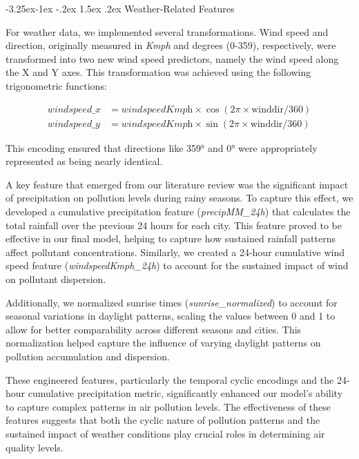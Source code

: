 \documentclass[twoside,11pt]{article}
\makeatletter
\renewcommand\subsubsection{\@startsection{subsubsection}{3}{\z@}%
  {-3.25ex\@plus -1ex \@minus -.2ex}%
  {1.5ex \@plus .2ex}%
  {\normalfont\bfseries\normalsize}}
\makeatother
\begin{document}
\subsubsection{Weather-Related Features}

For weather data, we implemented several transformations. Wind speed and direction, originally measured in \textit{Kmph} and degrees (0-359), respectively, were transformed into two new wind speed predictors, namely the wind speed along the X and Y axes. This transformation was achieved using the following trigonometric functions:

\begin{align*}
    \textit{windspeed\_x} &= \textit{windspeedKmph} \times \cos(2\pi \times \text{winddir}/360) \\
    \textit{windspeed\_y} &= \textit{windspeedKmph} \times \sin(2\pi \times \text{winddir}/360)
\end{align*}

This encoding ensured that directions like 359° and 0° were appropriately represented as being nearly identical.

A key feature that emerged from our literature review was the significant impact of precipitation on pollution levels during rainy seasons. To capture this effect, we developed a cumulative precipitation feature (\textit{precipMM\_24h}) that calculates the total rainfall over the previous 24 hours for each city. This feature proved to be effective in our final model, helping to capture how sustained rainfall patterns affect pollutant concentrations. Similarly, we created a 24-hour cumulative wind speed feature (\textit{windspeedKmph\_24h}) to account for the sustained impact of wind on pollutant dispersion.

Additionally, we normalized sunrise times (\textit{sunrise\_normalized}) to account for seasonal variations in daylight patterns, scaling the values between 0 and 1 to allow for better comparability across different seasons and cities. This normalization helped capture the influence of varying daylight patterns on pollution accumulation and dispersion.

These engineered features, particularly the temporal cyclic encodings and the 24-hour cumulative precipitation metric, significantly enhanced our model's ability to capture complex patterns in air pollution levels. The effectiveness of these features suggests that both the cyclic nature of pollution patterns and the sustained impact of weather conditions play crucial roles in determining air quality levels.
\end{document}

